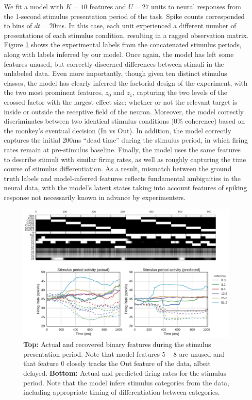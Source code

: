 \documentclass{article} %
\begin{document}
We fit a model with $K = 10$ features and $U = 27$ units to neural responses from the 1-second stimulus presentation period of the task. Spike counts corresponded to bins of $dt = 20$ms. In this case, each unit experienced a different number of presentations of each stimulus condition, resulting in a ragged observation matrix. Figure \ref{roitman} shows the experimental labels from the concatenated stimulus periods, along with labels inferred by our model. Once again, the model has left some features unused, but correctly discerned differences between stimuli in the unlabeled data. Even more importantly, though given ten distinct stimulus classes, the model has clearly inferred the factorial design of the experiment, with the two most prominent features, $z_0$ and $z_1$, capturing the two levels of the crossed factor with the largest effect size: whether or not the relevant target is inside or outside the receptive field of the neuron. Moreover, the model correctly discriminates between two identical stimulus conditions (0\% coherence) based on the monkey's eventual decision (In vs Out). In addition, the model correctly captures the initial 200ms ``dead time'' during the stimulus period, in which firing rates remain at pre-stimulus baseline. Finally, the model uses the same features to describe stimuli with similar firing rates, as well as roughly capturing the time course of stimulus differentiation. As a result, mismatch between the ground truth labels and model-inferred features reflects fundamental ambiguities in the neural data, with the model's latent states taking into account features of spiking response not necessarily known in advance by experimenters.

\begin{figure}[ht]
    \center
    \includegraphics[width=0.6\linewidth]{figures/roitman}
    \caption{\textbf{Top:} Actual and recovered binary features during the stimulus presentation period. Note that model features 5 -- 8 are unused and that feature 0 closely tracks the Out feature of the data, albeit delayed. \textbf{Bottom:} Actual and predicted firing rates for the stimulus period. Note that the model infers stimulus categories from the data, including appropriate timing of differentiation between categories.}
    \label{roitman}
\end{figure}
\end{document}
